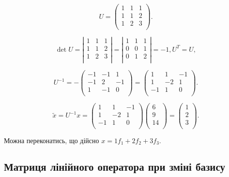 $$U = \begin{pmatrix}
	1 & 1 & 1 \\
	1 & 1 & 2 \\
	1 & 2 & 3 \\
\end{pmatrix}.$$

$$\det U = \left| \begin{matrix}
	1 & 1 & 1 \\
	1 & 1 & 2 \\
	1 & 2 & 3 \\
\end{matrix} \right| = \left| \begin{matrix}
	1 & 1 & 1 \\
	0 & 0 & 1 \\
	0 & 1 & 2 \\
\end{matrix} \right| = -1, U^T = U,$$

$$U^{-1} = -\begin{pmatrix}
	-1 & -1 &  1 \\
	-1 &  2 & -1 \\
	 1 & -1 &  0 \\
\end{pmatrix} = \begin{pmatrix}
	 1 &  1 & -1 \\
	 1 & -2 &  1 \\
	-1 &  1 &  0 \\
\end{pmatrix}.$$

$$\tilde{x} = U^{-1} x = \begin{pmatrix}
	 1 &  1 & -1 \\
	 1 & -2 &  1 \\
	-1 &  1 &  0 \\
\end{pmatrix} \begin{pmatrix}
	 6 \\
	 9 \\
	14 \\
\end{pmatrix} = \begin{pmatrix}
	1 \\
	2 \\
	3 \\
\end{pmatrix}.$$

Можна переконатись, що дійсно $x = 1 f_1 + 2 f_2 + 3 f_3$.


\subsection*{Матриця лінійного оператора при зміні базису}

